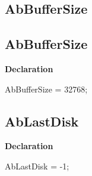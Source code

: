 \documentclass{report}
\newif\ifpdf
\begin{document}
\subsection*{\large{\textbf{AbBufferSize}}\normalsize\hspace{1ex}\hrulefill}
\else
\subsection*{AbBufferSize}
\fi
\label{AbArcTyp-AbBufferSize}
\begin{list}{}{
\setlength{\itemindent}{0cm}
\setlength{\listparindent}{0cm}
\setlength{\leftmargin}{\evensidemargin}
\addtolength{\leftmargin}{\tmplength}
\settowidth{\labelsep}{X}
\addtolength{\leftmargin}{\labelsep}
\setlength{\labelwidth}{\tmplength}
}
\item[\textbf{Declaration}\hfill]
\ifpdf
\begin{flushleft}
\fi
\begin{ttfamily}
AbBufferSize = 32768;\end{ttfamily}

\ifpdf
\end{flushleft}
\fi

\end{list}
\ifpdf
\subsection*{\large{\textbf{AbLastDisk}}\normalsize\hspace{1ex}\hrulefill}
\else
\subsection*{AbLastDisk}
\fi
\label{AbArcTyp-AbLastDisk}
\begin{list}{}{
\setlength{\itemindent}{0cm}
\setlength{\listparindent}{0cm}
\setlength{\leftmargin}{\evensidemargin}
\addtolength{\leftmargin}{\tmplength}
\settowidth{\labelsep}{X}
\addtolength{\leftmargin}{\labelsep}
\setlength{\labelwidth}{\tmplength}
}
\item[\textbf{Declaration}\hfill]
\ifpdf
\begin{flushleft}
\fi
\begin{ttfamily}
AbLastDisk = -1;\end{ttfamily}

\ifpdf
\end{flushleft}
\fi

\end{list}
\ifpdf
\end{document}
